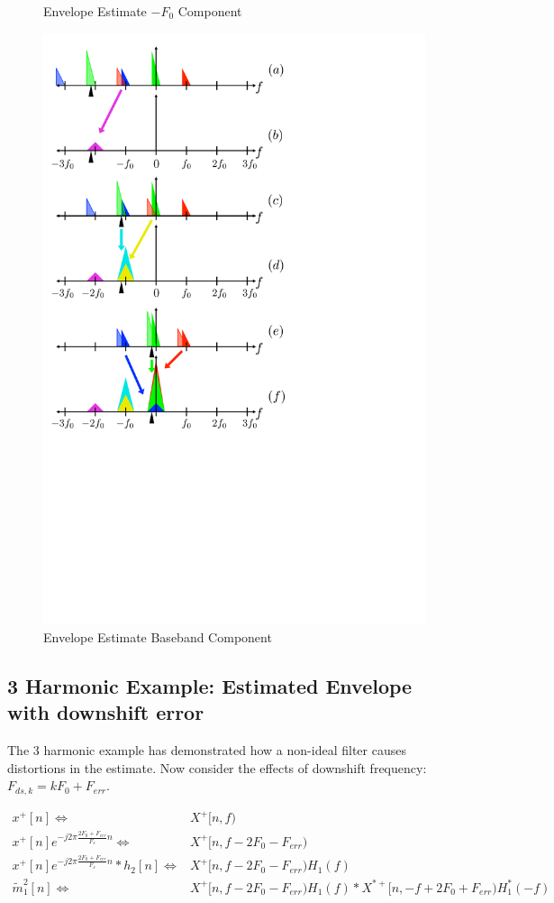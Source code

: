 \documentclass [11pt, proquest,oneside] {ganter_thesis}[2015/03/03]
\begin{document}
\begin{figure}[!ht]
    \caption{Envelope Estimate $-F_0$ Component}\label{fig:harmonic_envelope_F0}
    \includegraphics[width=.62\textwidth]{harmonic_envelope_0}
    \caption{Envelope Estimate Baseband Component}\label{fig:harmonic_envelope_0}
\end{figure}

\clearpage

\subsection{3 Harmonic Example: Estimated Envelope with downshift error}

The 3 harmonic example has demonstrated how a non-ideal filter causes distortions in the estimate.  Now consider the effects of downshift frequency: $F_{ds,k} = kF_0 + F_{err}$.

\begin{align}
\label{eq:harmonic_estimate_ERR_fig_a}
x^+[n] \Longleftrightarrow& X^+[n,f) \\
%
x^+[n]e^{-j2\pi \frac{2F_0 + F_{err}}{F_s}n} \Longleftrightarrow& X^+[n,f - 2F_0 - F_{err}) \\
%
\label{eq:harmonic_estimate_ERR_fig_c}
x^+[n]e^{-j2\pi \frac{2F_0 + F_{err}}{F_s}n} * h_2[n] \Longleftrightarrow& X^+[n,f - 2F_0 - F_{err}) H_1(f) \\
%
\label{eq:harmonic_estimate_ERR_fig_e}
\tilde{m}_1^2[n] \Longleftrightarrow& X^+[n,f - 2F_0 - F_{err}) H_1(f) * X^{*+}[n,-f + 2F_0 + F_{err}) H_1^*(-f)
\end{align}
\end{document}
